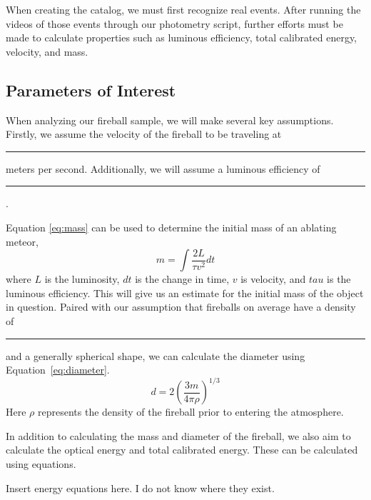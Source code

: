When creating the catalog, we must first recognize real events. 
After running the videos of those events through our photometry script, further efforts must be made to calculate properties such as luminous efficiency, total calibrated energy, velocity, and mass.




\subsection{Parameters of Interest}

When analyzing our fireball sample, we will make several key assumptions.  
Firstly, we assume the velocity of the fireball to be traveling at \rule{1cm}{.1pt} meters per second.
Additionally, we will assume a luminous efficiency of \rule{1cm}{.1pt}.

Equation \ref{eq:mass} can be used to determine the initial mass of an ablating meteor,
\begin{equation}
m = \int \frac{2L}{\tau v^2} dt
\label{eq:mass}
\end{equation}
where $L$ is the luminosity, $dt$ is the change in time, $v$ is velocity, and $tau$ is the luminous efficiency. 
This will give us an estimate for the initial mass of the object in question.
Paired with our assumption that fireballs on average have a density of \rule{1cm}{.1pt} and a generally spherical shape, we can calculate the diameter using Equation~\ref{eq:diameter}.
\begin{equation}
d = 2(\frac{3m}{4\pi \rho})^{1/3}
\label{eq:diameter}
\end{equation}
Here $\rho$ represents the density of the fireball prior to entering the atmosphere.

In addition to calculating the mass and diameter of the fireball, we also aim to calculate the optical energy and total calibrated energy.
These can be calculated using equations.

Insert energy equations here.  I do not know where they exist.

